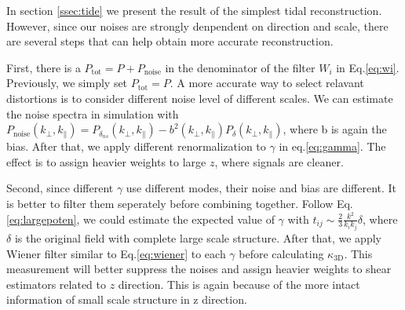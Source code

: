 In section \ref{ssec:tide} we present the result of the simplest tidal reconstruction. 
However, since our noises are strongly denpendent on direction and scale, 
there are several steps that can help obtain more accurate reconstruction.

First, there is a $P_{\mathrm{tot}}=P+P_\mathrm{noise}$ 
in the denominator of the filter $W_i$ in Eq.\ref{eq:wi}. 
Previously, we simply set $P_\mathrm{tot}=P$. 
A more accurate way to select relavant distortions is to consider different noise level of different scales. 
We can estimate the noise spectra in simulation with  
$P_\mathrm{noise}(k_\perp,k_\parallel)=P_{\delta_{ns}}(k_\perp,k_\parallel)-b^2(k_\perp,k_\parallel)P_\delta(k_\perp,k_\parallel)$, where b is again the bias. 
After that, we apply different renormalization to $\gamma$ in 
eq.\ref{eq:gamma}. 
The effect is to assign heavier weights to large $z$, where signals are cleaner.

Second, since different $\gamma$ use different modes, 
their noise and bias are different. 
It is better to filter them seperately before combining together. 
Follow Eq.\ref{eq:largepoten}, we could estimate the expected value of $\gamma$ 
with 
$t_{ij}\sim \frac{2}{3}\frac{k^2}{k_ik_j}\delta$, 
where $\delta$ is the original field with complete large scale structure. 
After that, we apply Wiener filter similar to Eq.\ref{eq:wiener} 
to each $\gamma$ before calculating $\kappa_\mathrm{3D}$. 
This measurement will better suppress the noises and assign heavier weights to 
shear estimators related to $z$ direction. 
This is again because of the more intact information of small scale structure in z direction.

